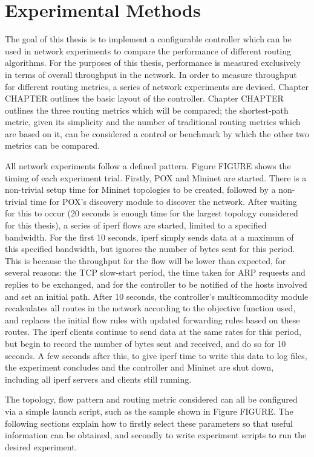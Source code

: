 \chapter{Experimental Methods}

The goal of this thesis is to implement a configurable controller which can be used in network experiments to compare the performance of different routing algorithms. For the purposes of this thesis, performance is measured exclusively in terms of overall throughput in the network. In order to measure throughput for different routing metrics, a series of network experiments are devised. Chapter CHAPTER outlines the basic layout of the controller. Chapter CHAPTER outlines the three routing metrics which will be compared; the shortest-path metric, given its simplicity and the number of traditional routing metrics which are based on it, can be considered a control or benchmark by which the other two metrics can be compared.

All network experiments follow a defined pattern. Figure FIGURE shows the timing of each experiment trial. Firstly, POX and Mininet are started. There is a non-trivial setup time for Mininet topologies to be created, followed by a non-trivial time for POX's discovery module to discover the network. After waiting for this to occur (20 seconds is enough time for the largest topology considered for this thesis), a series of iperf flows are started, limited to a specified bandwidth. For the first 10 seconds, iperf simply sends data at a maximum of this specified bandwidth, but ignores the number of bytes sent for this period. This is because the throughput for the flow will be lower than expected, for several reasons: the TCP slow-start period, the time taken for ARP requests and replies to be exchanged, and for the controller to be notified of the hosts involved and set an initial path. After 10 seconds, the controller's multicommodity module recalculates all routes in the network according to the objective function used, and replaces the initial flow rules with updated forwarding rules based on these routes. The iperf clients continue to send data at the same rates for this period, but begin to record the number of bytes sent and received, and do so for 10 seconds. A few seconds after this, to give iperf time to write this data to log files, the experiment concludes and the controller and Mininet are shut down, including all iperf servers and clients still running.

The topology, flow pattern and routing metric considered can all be configured via a simple launch script, such as the sample shown in Figure FIGURE. The following sections explain how to firstly select these parameters so that useful information can be obtained, and secondly to write experiment scripts to run the desired experiment. 

